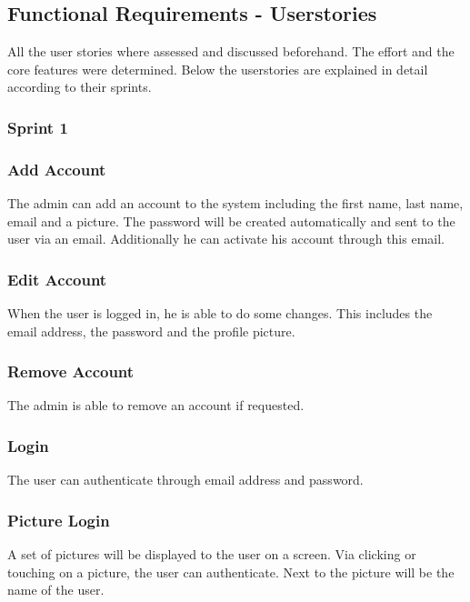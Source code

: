 \subsection{Functional Requirements - Userstories}\label{functional-requirements---userstories}

All the user stories where assessed and discussed beforehand. The effort
and the core features were determined. Below the userstories are
explained in detail according to their sprints.

\subsubsection{Sprint 1}\label{sprint-1}

\subsubsection*{Add Account}

The admin can add an account to the system including the first name,
last name, email and a picture. The password will be created
automatically and sent to the user via an email. Additionally he can
activate his account through this email.

\subsubsection*{Edit Account}

When the user is logged in, he is able to do some changes. This includes
the email address, the password and the profile picture.

\subsubsection*{Remove Account}

The admin is able to remove an account if requested.

\subsubsection*{Login}

The user can authenticate through email address and password.

\subsubsection*{Picture Login}

A set of pictures will be displayed to the user on a screen. Via
clicking or touching on a picture, the user can authenticate. Next to
the picture will be the name of the user.

